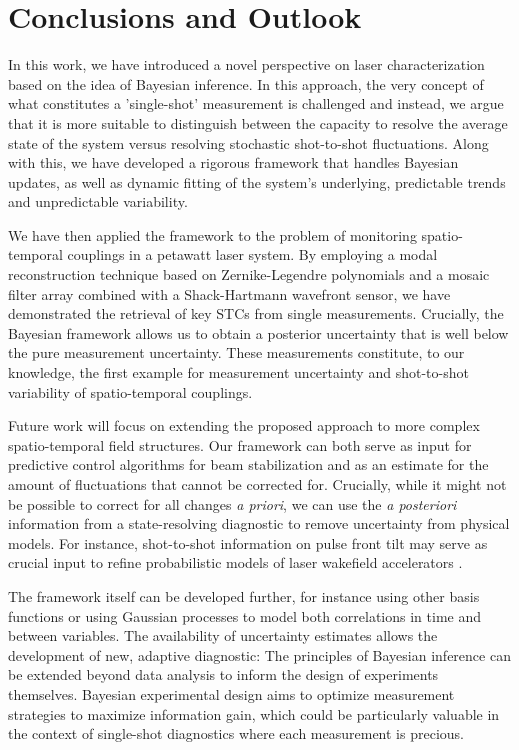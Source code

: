 \documentclass[9pt, twocolumn,superscriptaddress]{revtex4}
\begin{document}
\section{Conclusions and Outlook}


In this work, we have introduced a novel perspective on laser characterization based on the idea of Bayesian inference. In this approach, the very concept of what constitutes a 'single-shot' measurement is challenged and instead, we argue that it is more suitable to distinguish between the capacity to resolve the average state of the system versus resolving stochastic shot-to-shot fluctuations. Along with this, we have developed a rigorous framework that handles Bayesian updates, as well as dynamic fitting of the system's underlying, predictable trends and unpredictable variability.

We have then applied the framework to the problem of monitoring spatio-temporal couplings in a petawatt laser system. By employing a modal reconstruction technique based on Zernike-Legendre polynomials and a mosaic filter array combined with a Shack-Hartmann wavefront sensor, we have demonstrated the retrieval of key STCs from single measurements. Crucially, the Bayesian framework allows us to obtain a posterior uncertainty that is well below the pure measurement uncertainty. These measurements constitute, to our knowledge, the first example for measurement uncertainty and shot-to-shot variability of spatio-temporal couplings. 

Future work will focus on extending the proposed approach to more complex spatio-temporal field structures. Our framework can both serve as input for predictive control algorithms for beam stabilization and as an estimate for the amount of fluctuations that cannot be corrected for. Crucially, while it might not be possible to correct for all changes \textit{a priori}, we can use the \textit{a posteriori} information from a state-resolving diagnostic to remove uncertainty from physical models. For instance, shot-to-shot information on pulse front tilt may serve as crucial input to refine probabilistic models of laser wakefield accelerators \cite{dopp2023data, PhysRevLett.133.085001}.

The framework itself can be developed further, for instance using other basis functions or using Gaussian processes to model both correlations in time and between variables. The availability of uncertainty estimates allows the development of new, adaptive diagnostic: The principles of Bayesian inference can be extended beyond data analysis to inform the design of experiments themselves. Bayesian experimental design aims to optimize measurement strategies to maximize information gain, which could be particularly valuable in the context of single-shot diagnostics where each measurement is precious. 
\end{document}
